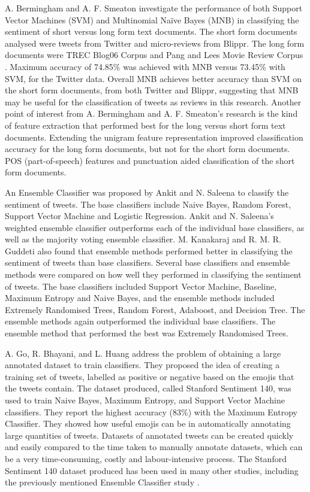 A. Bermingham and A. F. Smeaton \cite{Berm2010} investigate the performance of both Support Vector Machines (SVM) and Multinomial Naïve Bayes (MNB) in classifying the sentiment of short versus long form text documents. The short form documents analysed were tweets from Twitter and micro-reviews from Blippr. The long form documents were TREC Blog06 Corpus and Pang and Lees Movie Review Corpus \cite{panglee2004}. Maximum accuracy of 74.85\% was achieved with MNB versus 73.45\% with SVM, for the Twitter data. Overall MNB achieves better accuracy than SVM on the short form documents, from both Twitter and Blippr, suggesting that MNB may be useful for the classification of tweets as reviews in this research. Another point of interest from A. Bermingham and A. F. Smeaton's research is the kind of feature extraction that performed best for the long versus short form text documents. Extending the unigram feature representation improved classification accuracy for the long form documents, but not for the short form documents. POS (part-of-speech) features and punctuation aided classification of the short form documents.

An Ensemble Classifier was proposed by Ankit and N. Saleena \cite{Ankit2018} to classify the sentiment of tweets. The base classifiers include Naive Bayes, Random Forest, Support Vector Machine and Logistic Regression. Ankit and N. Saleena's weighted ensemble classifier outperforms each of the individual base classifiers, as well as the majority voting ensemble classifier. M. Kanakaraj and R. M. R. Guddeti \cite{Kanakaraj2015} also found that ensemble methods performed better in classifying the sentiment of tweets than base classifiers. Several base classifiers and ensemble methods were compared on how well they performed in classifying the sentiment of tweets. The base classifiers included Support Vector Machine, Baseline, Maximum Entropy and Naive Bayes, and the ensemble methods included Extremely Randomised Trees, Random Forest, Adaboost, and Decision Tree. The ensemble methods again outperformed the individual base classifiers. The ensemble method that performed the best was Extremely Randomised Trees.

A. Go, R. Bhayani, and L. Huang \cite{Go2009} address the problem of obtaining a large annotated dataset to train classifiers. They proposed the idea of creating a training set of tweets, labelled as positive or negative based on the emojis that the tweets contain. The dataset produced, called Stanford Sentiment 140, was used to train Naive Bayes, Maximum Entropy, and Support Vector Machine classifiers. They report the highest accuracy (83\%) with the Maximum Entropy Classifier. They showed how useful emojis can be in automatically annotating large quantities of tweets. Datasets of annotated tweets can be created quickly and easily compared to the time taken to manually annotate datasets, which can be a very time-consuming, costly and labour-intensive process. The Stanford Sentiment 140 dataset produced has been used in many other studies, including the previously mentioned Ensemble Classifier study \cite{Ankit2018}.

